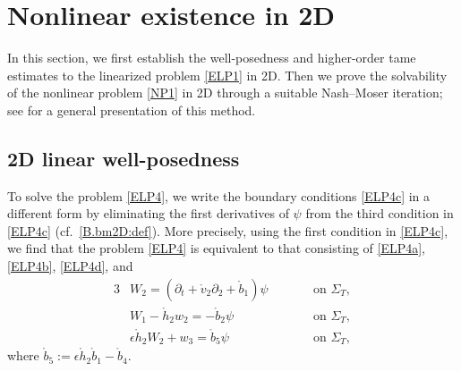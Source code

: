 \documentclass[twoside,11pt]{article}
\numberwithin{equation}{section}
\def\p{\partial}
\begin{document}
	
	
	




 \vspace*{2mm}

\section{Nonlinear existence in 2D}	 \label{sec:2D}
In this section, we %
first establish the well-posedness and higher-order tame estimates to the linearized problem \eqref{ELP1} in 2D. %
Then we prove the solvability of the nonlinear problem \eqref{NP1} in 2D through a suitable Nash--Moser iteration; see \cite{AG07MR2304160, S16MR3524197} for a general presentation of this method.

\subsection{2D linear well-posedness}
To solve the problem \eqref{ELP4},
we write the boundary conditions \eqref{ELP4c} in a different form
by eliminating the first derivatives of $\psi$ from the third condition in \eqref{ELP4c} (cf.~\eqref{B.bm2D:def}).
More precisely, using the first condition in \eqref{ELP4c},
we find that the problem \eqref{ELP4} is equivalent to that consisting of
\eqref{ELP4a}, \eqref{ELP4b}, \eqref{ELP4d}, and
\begin{alignat}{3}
\label{BC.2Da}	
&W_2=(\p_t+\mathring{v}_2\p_2+\mathring{b}_1)\psi
\qquad &&\textrm{on }\Sigma_T,\\
\label{BC.2Db}	
&W_1-\mathring{{h}}_2 w_2=-\mathring{b}_2 \psi
&&\textrm{on }\Sigma_T,\\
\label{BC.2Dc}	
&\epsilon \mathring{h}_2 W_2+w_3=\mathring{b}_5 \psi&&\textrm{on }\Sigma_T,
\end{alignat}
where $\mathring{b}_5:=\epsilon \mathring{h}_2 \mathring{b}_1-\mathring{b}_4.$
\end{document}
